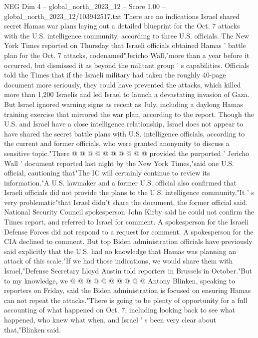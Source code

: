\begin{textsample}{NEG Dim 4 – global\_north\_2023\_12 – Score 1.00 – global\_north\_2023\_12/103942517.txt}  \label{ex:f4_neg_145}
There are no indications Israel shared secret Hamas war plans laying out a detailed blueprint for the Oct. 7 attacks with the U.S. intelligence community, according to three U.S. officials.
The New York Times reported on Thursday that Israeli officials obtained Hamas ' battle plan for the Oct. 7 attacks, codenamed"Jericho Wall,"more than a year before it occurred, but dismissed it as beyond the militant group ' s capabilities.
Officials told the Times that if the Israeli military had taken the roughly 40-page document more seriously, they could have prevented the attacks, which killed more than 1,200 Israelis and led Israel to launch a devastating invasion of Gaza.
But Israel ignored warning signs as recent as July, including a daylong Hamas training exercise that mirrored the war plan, according to the report.
Though the U.S. and Israel have a close intelligence relationship, Israel does not appear to have shared the secret battle plans with U.S. intelligence officials, according to the current and former officials, who were granted anonymity to discuss a sensitive topic."There @ @ @ @ @ @ @ @ @ @ provided the purported ' Jericho Wall ' document reported last night by the New York Times,"said one U.S. official, cautioning that"The IC will certainly continue to review its information."A U.S. lawmaker and a former U.S. official also confirmed that Israeli officials did not provide the plans to the U.S. intelligence community."It ' s very problematic"that Israel didn't share the document, the former official said.
National Security Council spokesperson John Kirby said he could not confirm the Times report, and referred to Israel for comment.
A spokesperson for the Israeli Defense Forces did not respond to a request for comment.
A spokesperson for the CIA declined to comment.
But top Biden administration officials have previously said explicitly that the U.S. had no knowledge that Hamas was planning an attack of this scale."If we had those indications, we would share them with Israel,"Defense Secretary Lloyd Austin told reporters in Brussels in October."But to my knowledge, we @ @ @ @ @ @ @ @ @ @ Antony Blinken, speaking to reporters on Friday, said the Biden administration is focused on ensuring Hamas can not repeat the attacks."There is going to be plenty of opportunity for a full accounting of what happened on Oct. 7, including looking back to see what happened, who knew what when, and Israel ' s been very clear about that,"Blinken said.

\end{textsample}

